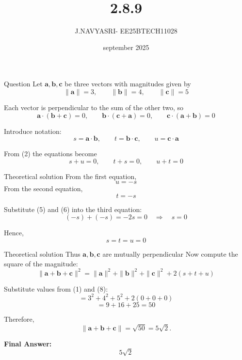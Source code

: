 \documentclass{beamer}
\title %
{2.8.9}
\date{september 2025}
\author %
{J.NAVYASRI- EE25BTECH11028}
\begin{document}
\frame{\titlepage}
\begin{frame}{Question}
Let $\mathbf a,\mathbf b,\mathbf c$ be three vectors with magnitudes given by
\begin{equation}
\|\mathbf a\| = 3,\qquad \|\mathbf b\| = 4,\qquad \|\mathbf c\| = 5
\end{equation}

Each vector is perpendicular to the sum of the other two, so
\begin{equation}
\mathbf a\cdot(\mathbf b+\mathbf c)=0,\qquad
\mathbf b\cdot(\mathbf c+\mathbf a)=0,\qquad
\mathbf c\cdot(\mathbf a+\mathbf b)=0
\end{equation}

{Introduce notation:}
\begin{equation}
s=\mathbf a\cdot\mathbf b,\qquad t=\mathbf b\cdot\mathbf c,\qquad u=\mathbf c\cdot\mathbf a
\end{equation}

From (2) the equations become
\begin{equation}
s+u=0,\qquad t+s=0,\qquad u+t=0
\end{equation}
\end{frame}

\begin{frame}{Theoretical solution}
From the first equation,
\begin{equation}
u=-s
\end{equation}
From the second equation,
\begin{equation}
t=-s
\end{equation}

Substitute (5) and (6) into the third equation:
\begin{equation}
(-s)+(-s) = -2s = 0 \quad\Rightarrow\quad s=0
\end{equation}

Hence,
\begin{equation}
s=t=u=0
\end{equation}
\end{frame}

\begin{frame}{Theoretical solution}
Thus $\mathbf a,\mathbf b,\mathbf c$ are mutually perpendicular Now compute the square of the magnitude:
\begin{equation}
\|\mathbf a+\mathbf b+\mathbf c\|^2
= \|\mathbf a\|^2 + \|\mathbf b\|^2 + \|\mathbf c\|^2 + 2(s+t+u)
\end{equation}

Substitute values from (1) and (8):
\begin{equation}
= 3^2 + 4^2 + 5^2 + 2(0+0+0)
\end{equation}
\begin{equation}
= 9 + 16 + 25 = 50
\end{equation}

Therefore,
\begin{equation}
\|\mathbf a+\mathbf b+\mathbf c\| = \sqrt{50} = 5\sqrt{2}.
\end{equation}

\textbf{Final Answer:} 
\[
\boxed{5\sqrt{2}}
\]
\end{frame}
\end{document}
